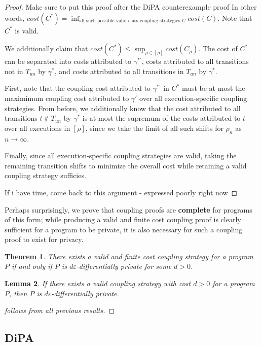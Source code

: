 \documentclass[12pt]{article}
\newtheorem{thm}{Theorem}[section]
\newtheorem{lemma}[thm]{Lemma}
\theoremstyle{definition}
\begin{document}
\begin{proof}{\color{red} Make sure to put this proof after the DiPA counterexample proof}
    In other words, $cost(C^*) = \inf_{\text{all such possible valid class coupling strategies } C} cost(C)$. Note that $C^*$ is valid. 

    We additionally claim that $cost(C^*)\leq \sup_{\rho\in [\rho]}cost(C_\rho)$. The cost of $C^*$ can be separated into costs attributed to $\gamma^{*\prime}$, costs attributed to all transitions not in $T_{un}$ by $\gamma^*$, and costs attributed to all transitions in $T_{un}$ by $\gamma^*$. 
    
    First, note that the coupling cost attributed to $\gamma^{*\prime}$ in $C^*$ must be at most the maximimum coupling cost attributed to $\gamma'$ over all execution-specific coupling strategies. From before, we additionally know that the cost attributed to all transitions $t\notin T_{un}$ by $\gamma^*$ is at most the supremum of the costs attributed to $t$ over all executions in $[\rho]$, since we take the limit of all such shifts for $\rho_n$ as $n\to\infty$.

    Finally, since all execution-specific coupling strategies are valid, taking the remaining transition shifts to minimize the overall cost while retaining a valid coupling strategy sufficies. 

    {\color{red} If i have time, come back to this argument - expressed poorly right now}
\end{proof}

Perhaps surprisingly, we prove that coupling proofs are \textbf{complete} for programs of this form; while producing a valid and finite cost coupling proof is clearly sufficient for a program to be private, it is also necessary for such a coupling proof to exist for privacy. 

\begin{thm}
    There exists a valid and finite cost coupling strategy for a program $P$ if and only if $P$ is $d\varepsilon$-differentially private for some $d>0$. 
\end{thm}

\begin{lemma}
    If there exists a valid coupling strategy with cost $d>0$ for a program $P$, then $P$ is $d\varepsilon$-differentially private. 
\end{lemma}
\begin{proof}
    [follows from all previous results]
\end{proof}


\subsection{DiPA}
\end{document}
